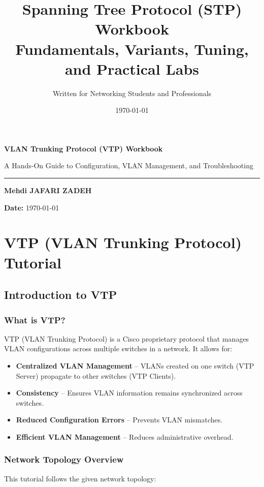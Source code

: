 \documentclass[a4paper]{book}
\title{\Huge \textbf{Spanning Tree Protocol (STP) Workbook}\\
       \Large Fundamentals, Variants, Tuning, and Practical Labs}
\author{\Large Written for Networking Students and Professionals}
\date{\today}
\begin{document}
\begin{titlepage}
    \centering

    \vspace*{4cm}
    {\Huge \textbf{VLAN Trunking Protocol (VTP) Workbook}\par}
    \vspace{0.8cm}
    {\Large A Hands-On Guide to Configuration, VLAN Management, and Troubleshooting\par}
    \vspace{0.3cm}
    \rule{0.9\textwidth}{1pt}
    
    \vspace{0.6cm}
    {\large \textbf{Mehdi JAFARI ZADEH}}\par
    \vspace{0.3cm}

    
    \vfill
    \textbf{Date:} \today
    \vspace{2cm}
\end{titlepage}


\tableofcontents

\chapter{VTP (VLAN Trunking Protocol) Tutorial}

\section{Introduction to VTP}
\subsection{What is VTP?}
VTP (VLAN Trunking Protocol) is a Cisco proprietary protocol that manages VLAN configurations across multiple switches in a network. It allows for:
\begin{itemize}
    \item \textbf{Centralized VLAN Management} – VLANs created on one switch (VTP Server) propagate to other switches (VTP Clients).
    \item \textbf{Consistency} – Ensures VLAN information remains synchronized across switches.
    \item \textbf{Reduced Configuration Errors} – Prevents VLAN mismatches.
    \item \textbf{Efficient VLAN Management} – Reduces administrative overhead.
\end{itemize}

\subsection{Network Topology Overview}
This tutorial follows the given network topology:
\end{document}
